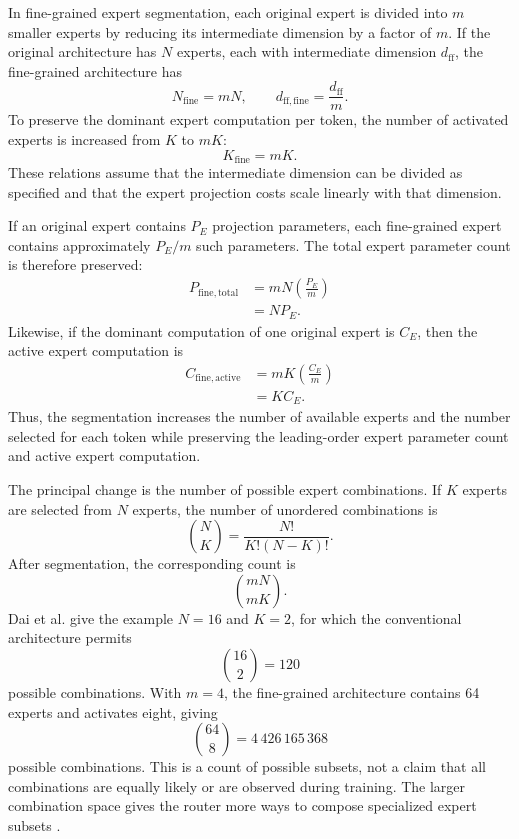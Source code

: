 In fine-grained expert segmentation, each original expert is divided
into \(m\) smaller experts by reducing its intermediate dimension by
a factor of \(m\). If the original architecture has \(N\) experts,
each with intermediate dimension \(d_{\mathrm{ff}}\), the fine-grained
architecture has
\begin{equation}
    N_{\mathrm{fine}}=mN,
    \qquad
    d_{\mathrm{ff,fine}}=\frac{d_{\mathrm{ff}}}{m}.
    \label{eq:deepseek-fine-grained-dimensions}
\end{equation}
To preserve the dominant expert computation per token, the number of
activated experts is increased from \(K\) to \(mK\):
\begin{equation}
    K_{\mathrm{fine}}=mK.
    \label{eq:deepseek-fine-grained-topk}
\end{equation}
These relations assume that the intermediate dimension can be divided
as specified and that the expert projection costs scale linearly with
that dimension.

If an original expert contains \(P_E\) projection parameters, each
fine-grained expert contains approximately \(P_E/m\) such parameters.
The total expert parameter count is therefore preserved:
\begin{align}
    P_{\mathrm{fine,total}}
    &=
    mN\left(\frac{P_E}{m}\right)\\
    &=
    NP_E.
    \label{eq:deepseek-total-parameters}
\end{align}
Likewise, if the dominant computation of one original expert is
\(C_E\), then the active expert computation is
\begin{align}
    C_{\mathrm{fine,active}}
    &=
    mK\left(\frac{C_E}{m}\right)\\
    &=
    KC_E.
    \label{eq:deepseek-active-computation}
\end{align}
Thus, the segmentation increases the number of available experts and
the number selected for each token while preserving the leading-order
expert parameter count and active expert computation.

The principal change is the number of possible expert combinations.
If \(K\) experts are selected from \(N\) experts, the number of
unordered combinations is
\begin{equation}
    \binom{N}{K}
    =
    \frac{N!}{K!(N-K)!}.
    \label{eq:moe-combination-count}
\end{equation}
After segmentation, the corresponding count is
\begin{equation}
    \binom{mN}{mK}.
    \label{eq:deepseek-combination-count}
\end{equation}
Dai et al. give the example \(N=16\) and \(K=2\), for which the
conventional architecture permits
\[
    \binom{16}{2}=120
\]
possible combinations. With \(m=4\), the fine-grained architecture
contains 64 experts and activates eight, giving
\[
    \binom{64}{8}
    =
    4\,426\,165\,368
\]
possible combinations. This is a count of possible subsets, not a
claim that all combinations are equally likely or are observed during
training. The larger combination space gives the router more ways to
compose specialized expert subsets \parencite{dai2024deepseekmoe}.

